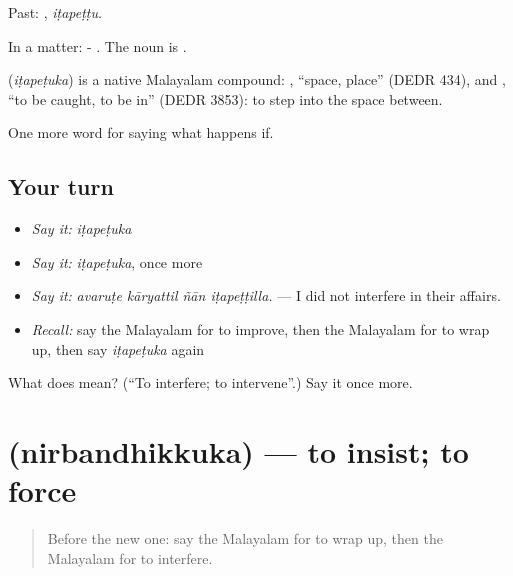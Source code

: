 Past: , \emph{iṭapeṭṭu}.

In a matter: - . The noun is .

\begin{cousinweb}
\textbf{} (\emph{iṭapeṭuka}) is a native Malayalam compound: , \textquotedblleft{}space, place\textquotedblright{} (DEDR 434), and , \textquotedblleft{}to be caught, to be in\textquotedblright{} (DEDR 3853): to step into the space between.
\end{cousinweb}

\begin{grammarlens}[title={What you've built}]
One more word for saying what happens if.
\end{grammarlens}

\subsection*{Your turn}
\begin{itemize}
\raggedright
  \item \emph{Say it:} \emph{iṭapeṭuka}
  \item \emph{Say it:} \emph{iṭapeṭuka}, once more
  \item \emph{Say it:} \emph{avaruṭe kāryattil ñān iṭapeṭṭilla.} — I did not interfere in their affairs.
  \item \emph{Recall:} say the Malayalam for to improve, then the Malayalam for to wrap up, then say \emph{iṭapeṭuka} again
\end{itemize}

\begin{tcolorbox}[breakable,colback=teal!4,colframe=teal!35!black,title={Before you move on}]
What does  mean? (\textquotedblleft{}To interfere; to intervene\textquotedblright{}.) Say it once more.
\end{tcolorbox}
\section[\texorpdfstring{\ml{നിർബന്ധിക്കുക} (nirbandhikkuka)}{നിർബന്ധിക്കുക (nirbandhikkuka)}]{ (nirbandhikkuka) — to insist; to force}

\label{lesson:ML-C451-nirbandhikkuka}



\begin{quote}
Before the new one: say the Malayalam for to wrap up, then the Malayalam for to interfere.
\end{quote}

